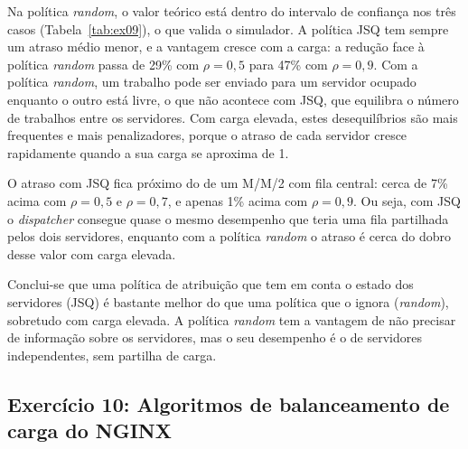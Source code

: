 \documentclass[10pt,a4paper]{article}
\begin{document}
Na política \textit{random}, o valor teórico está dentro do intervalo de confiança nos três casos (Tabela~\ref{tab:ex09}), o que valida o simulador. A política JSQ tem sempre um atraso médio menor, e a vantagem cresce com a carga: a redução face à política \textit{random} passa de 29\% com $\rho=0{,}5$ para 47\% com $\rho=0{,}9$. Com a política \textit{random}, um trabalho pode ser enviado para um servidor ocupado enquanto o outro está livre, o que não acontece com JSQ, que equilibra o número de trabalhos entre os servidores. Com carga elevada, estes desequilíbrios são mais frequentes e mais penalizadores, porque o atraso de cada servidor cresce rapidamente quando a sua carga se aproxima de 1.

O atraso com JSQ fica próximo do de um M/M/2 com fila central: cerca de 7\% acima com $\rho=0{,}5$ e $\rho=0{,}7$, e apenas 1\% acima com $\rho=0{,}9$. Ou seja, com JSQ o \textit{dispatcher} consegue quase o mesmo desempenho que teria uma fila partilhada pelos dois servidores, enquanto com a política \textit{random} o atraso é cerca do dobro desse valor com carga elevada.

Conclui-se que uma política de atribuição que tem em conta o estado dos servidores (JSQ) é bastante melhor do que uma política que o ignora (\textit{random}), sobretudo com carga elevada. A política \textit{random} tem a vantagem de não precisar de informação sobre os servidores, mas o seu desempenho é o de servidores independentes, sem partilha de carga.

\subsection{Exercício 10: Algoritmos de balanceamento de carga do NGINX}
\end{document}
